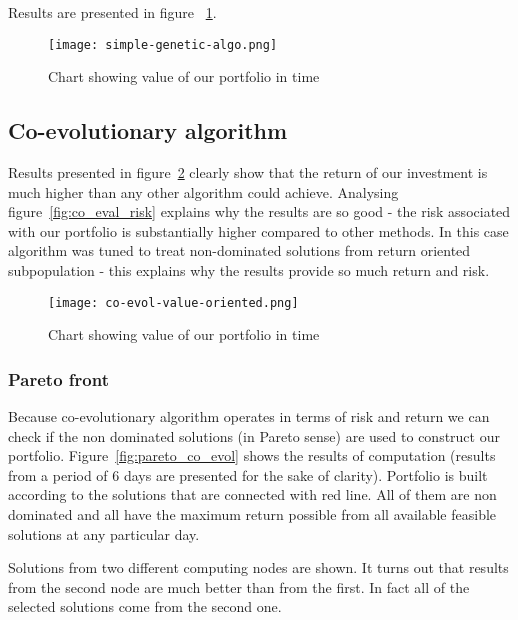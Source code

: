 Results are presented in figure ~\ref{fig:gen-algo}.

\begin{figure}[ht]
  \begin{center}
    \texttt{[image: simple-genetic-algo.png]}
  \end{center}
  \caption{Chart showing value of our portfolio in time}
  \label{fig:gen-algo}
\end{figure}

\subsection{Co-evolutionary algorithm}
\label{sec:co-evol-2}

Results presented in figure~\ref{fig:co_eval_return} clearly show that the return of our investment is much higher than any other algorithm could achieve.  
Analysing figure~\ref{fig:co_eval_risk} explains why the results are so good - the risk associated with our portfolio is substantially higher compared to other methods.
In this case algorithm was tuned to treat non-dominated solutions from return oriented subpopulation - this explains why the results provide so much return and risk. 

\begin{figure}[ht]
  \begin{center}
    \texttt{[image: co-evol-value-oriented.png]}
  \end{center}
  \caption{Chart showing value of our portfolio in time}
  \label{fig:co_eval_return}
\end{figure}

\subsubsection{Pareto front}

Because co-evolutionary algorithm operates in terms of risk and return we can check if the non dominated solutions (in Pareto sense) are used to construct our portfolio.
Figure~\ref{fig:pareto_co_evol} shows the results of computation (results from a period of 6 days are presented for the sake of clarity). 
Portfolio is built according to the solutions that are connected with red line.
All of them are non dominated and all have the maximum return possible from all available feasible solutions at any particular day.

Solutions from two different computing nodes are shown.
It turns out that results from the second node are much better than from the first.
In fact all of the selected solutions come from the second one.

